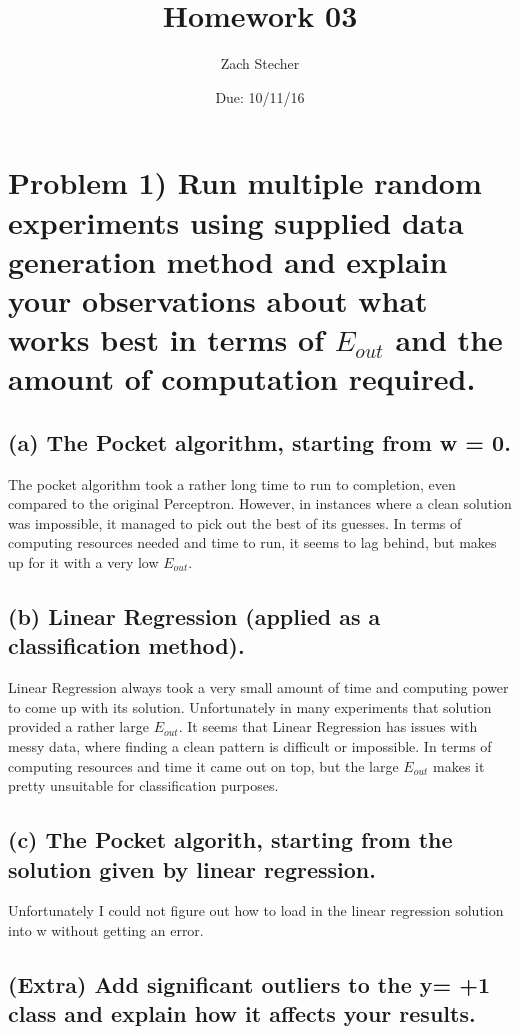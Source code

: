 \documentclass[11pt]{article}
\title{Homework 03}
\author{Zach Stecher}
\date{Due: 10/11/16}
\begin{document}
\maketitle

\section*{Problem 1) Run multiple random experiments using supplied data generation method and explain your observations about what works best in terms of $E_{out}$ and the amount of computation required.}

\subsection*{(a) The Pocket algorithm, starting from w = 0.}

The pocket algorithm took a rather long time to run to completion, even compared to the original Perceptron. However, in instances where a clean solution was impossible, it managed to pick out the best of its guesses. In terms of computing resources needed and time to run, it seems to lag behind, but makes up for it with a very low $E_{out}$.

\subsection*{(b) Linear Regression (applied as a classification method).}

Linear Regression always took a very small amount of time and computing power to come up with its solution. Unfortunately in many experiments that solution provided a rather large $E_{out}$. It seems that Linear Regression has issues with messy data, where finding a clean pattern is difficult or impossible. In terms of computing resources and time it came out on top, but the large $E_{out}$ makes it pretty unsuitable for classification purposes.

\subsection*{(c) The Pocket algorith, starting from the solution given by linear regression.}

Unfortunately I could not figure out how to load in the linear regression solution into w without getting an error.

\subsection*{(Extra) Add significant outliers to the y= +1 class and explain how it affects your results.}
\end{document}
